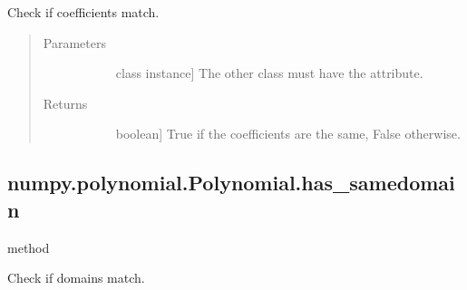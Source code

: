 \documentclass[letterpaper,10pt,english]{sphinxmanual}
\begin{document}
\begin{fulllineitems}
\begin{fulllineitems}
\label{\detokenize{generated/generated/numpy.polynomial.Polynomial.has_samecoef:numpy.polynomial.Polynomial.has_samecoef}}
Check if coefficients match.

\begin{quote}\begin{description}
\item[{Parameters}] \leavevmode\begin{description}
\item[{}] \leavevmode{[}class instance{]}
The other class must have the  attribute.

\end{description}

\item[{Returns}] \leavevmode\begin{description}
\item[{}] \leavevmode{[}boolean{]}
True if the coefficients are the same, False otherwise.

\end{description}

\end{description}\end{quote}

\end{fulllineitems}



\subsection{numpy.polynomial.Polynomial.has\_samedomain}
\label{\detokenize{generated/generated/numpy.polynomial.Polynomial.has_samedomain:numpy-polynomial-polynomial-has-samedomain}}\label{\detokenize{generated/generated/numpy.polynomial.Polynomial.has_samedomain::doc}}
method

\begin{fulllineitems}
\label{\detokenize{generated/generated/numpy.polynomial.Polynomial.has_samedomain:numpy.polynomial.Polynomial.has_samedomain}}
Check if domains match.


\end{fulllineitems}
\end{fulllineitems}
\end{document}
